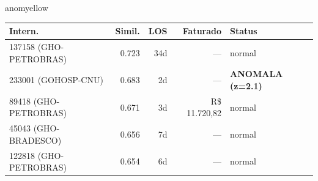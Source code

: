 \documentclass[a4paper,10pt]{article}
\begin{document}
\begin{anomalycard}[Internacao 137264 | GHO-PETROBRAS | MODERADO (z=2.54)]{anomyellow}
\begin{tabular}{l r r r l}\toprule\textbf{Intern.} & \textbf{Simil.} & \textbf{LOS} & \textbf{Faturado} & \textbf{Status} \\\midrule
137158 (GHO-PETROBRAS) & 0.723 & 34d & --- & \textcolor{jcubeblue}{normal} \\
233001 (GOHOSP-CNU) & 0.683 & 2d & --- & \textcolor{anomred}{\textbf{ANOMALA (z=2.1)}} \\
89418 (GHO-PETROBRAS) & 0.671 & 3d & R\$ 11.720,82 & \textcolor{jcubeblue}{normal} \\
45043 (GHO-BRADESCO) & 0.656 & 7d & --- & \textcolor{jcubeblue}{normal} \\
122818 (GHO-PETROBRAS) & 0.654 & 6d & --- & \textcolor{jcubeblue}{normal} \\
\bottomrule\end{tabular}


\end{anomalycard}

\newpage
\end{document}
